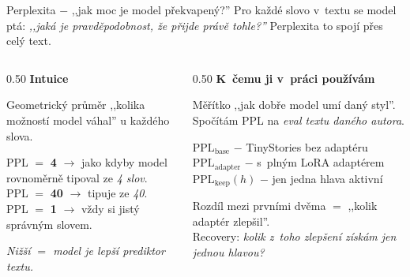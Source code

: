 \documentclass[aspectratio=169,10pt]{beamer}
\begin{document}
\begin{frame}[t]{Perplexita $-$ ,,jak moc je model překvapený?''}
  \vspace{2mm}
  {\small Pro každé slovo v~textu se model ptá: \emph{,,jaká je pravděpodobnost, že přijde právě tohle?''} Perplexita to spojí přes celý text.}\par\vspace{4mm}

  \begin{columns}[T,onlytextwidth]
    \begin{column}{0.50\textwidth}
      {\normalsize\textbf{Intuice}}\par\vspace{1mm}
      {\footnotesize\color{mutedText}Geometrický průměr ,,kolika možností model váhal'' u každého slova.}\par\vspace{3mm}
      {\footnotesize PPL $=$ \textbf{4} $\to$ jako kdyby model rovnoměrně tipoval ze \emph{4 slov}.\\
      PPL $=$ \textbf{40} $\to$ tipuje ze \emph{40}.\\
      PPL $=$ \textbf{1} $\to$ vždy si jistý správným slovem.}\par\vspace{4mm}
      {\footnotesize\color{mutedText}\itshape Nižší $=$ model je lepší prediktor textu.}
    \end{column}
    \begin{column}{0.50\textwidth}
      {\normalsize\textbf{K~čemu ji v~práci používám}}\par\vspace{1mm}
      {\footnotesize\color{mutedText}Měřítko ,,jak dobře model umí daný styl''. Spočítám PPL na \emph{eval textu daného autora}.}\par\vspace{3mm}
      {\footnotesize
      $\text{PPL}_\text{base}$ $-$ TinyStories bez adaptéru\\
      $\text{PPL}_\text{adapter}$ $-$ s~plným LoRA adaptérem\\
      $\text{PPL}_\text{keep}(h)$ $-$ jen jedna hlava aktivní\\}\par\vspace{3mm}
      {\footnotesize Rozdíl mezi prvními dvěma $=$ ,,kolik adaptér zlepšil''.\\
      Recovery: \emph{kolik z~toho zlepšení získám jen jednou hlavou?}}
    \end{column}
  \end{columns}
\end{frame}
\end{document}
